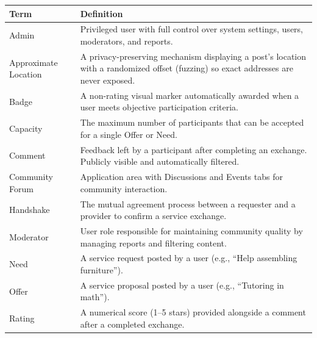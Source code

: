 \documentclass[10pt,a4paper]{report}
\begin{document}
\begin{longtable}{|p{3.5cm}|p{11cm}|}
    \hline
    \textbf{Term}             & \textbf{Definition}                                                                                                                       \\
    \hline
    \endhead
    Admin                     & Privileged user with full control over system settings, users, moderators, and reports.                                                   \\
    \hline
    Approximate Location      & A privacy-preserving mechanism displaying a post's location with a randomized offset (fuzzing) so exact addresses are never exposed.      \\
    \hline
    Badge                     & A non-rating visual marker automatically awarded when a user meets objective participation criteria.                                       \\
    \hline
    Capacity                  & The maximum number of participants that can be accepted for a single Offer or Need.                                                       \\
    \hline
    Comment                   & Feedback left by a participant after completing an exchange. Publicly visible and automatically filtered.                                 \\
    \hline
    Community Forum           & Application area with Discussions and Events tabs for community interaction.                                                              \\
    \hline
    Handshake                 & The mutual agreement process between a requester and a provider to confirm a service exchange.                                            \\
    \hline
    Moderator                 & User role responsible for maintaining community quality by managing reports and filtering content.                                        \\
    \hline
    Need                      & A service request posted by a user (e.g., ``Help assembling furniture'').                                                                 \\
    \hline
    Offer                     & A service proposal posted by a user (e.g., ``Tutoring in math'').                                                                        \\
    \hline
    Rating                    & A numerical score (1--5 stars) provided alongside a comment after a completed exchange.                                                   \\

\end{longtable}
\end{document}

